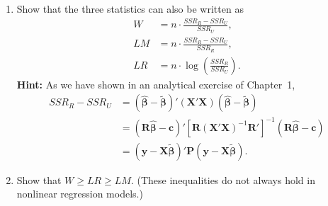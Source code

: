 \begin{problemset}
\begin{enumerate}[label=(\alph*)]
\item Show that the three statistics can also be written as
\begin{align*}
W &= n \cdot \frac{SSR_R - SSR_U}{SSR_U}, \\[4pt]
LM &= n \cdot \frac{SSR_R - SSR_U}{SSR_R}, \\[4pt]
LR &= n \cdot \log\!\left(\frac{SSR_R}{SSR_U}\right).
\end{align*}
\textbf{Hint:} As we have shown in an analytical exercise of Chapter~1,
\begin{align*}
SSR_R - SSR_U &= (\hat{\bm{\beta}} - \tilde{\bm{\beta}})'(\mathbf{X}'\mathbf{X})(\hat{\bm{\beta}} - \tilde{\bm{\beta}}) \\
&= (\mathbf{R}\hat{\bm{\beta}} - \mathbf{c})'[\mathbf{R}(\mathbf{X}'\mathbf{X})^{-1}\mathbf{R}']^{-1}(\mathbf{R}\hat{\bm{\beta}} - \mathbf{c}) \\
&= (\mathbf{y} - \mathbf{X}\tilde{\bm{\beta}})'\mathbf{P}(\mathbf{y} - \mathbf{X}\tilde{\bm{\beta}}).
\end{align*}

\item Show that $W \geq LR \geq LM$. (These inequalities do not always hold in nonlinear regression models.)
\end{enumerate}

\end{problemset}

